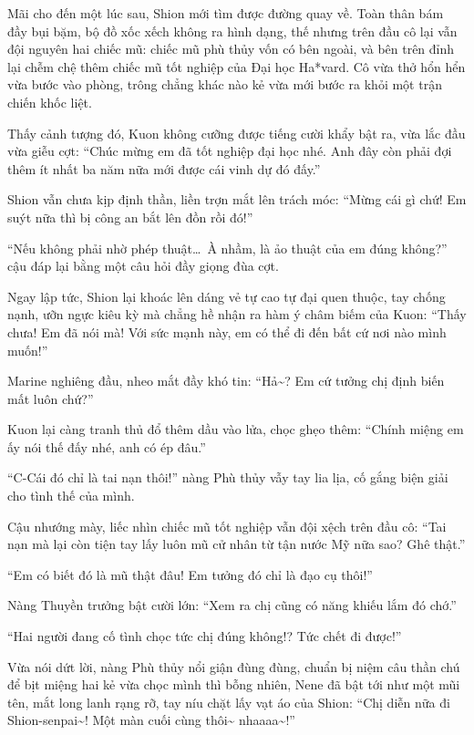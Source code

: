 \documentclass[../main.tex]{subfiles}
\begin{document}
Mãi cho đến một lúc sau, Shion mới tìm được đường quay về. Toàn thân bám đầy bụi bặm, bộ đồ xốc xếch không ra hình dạng, thế nhưng trên đầu cô lại vẫn đội nguyên hai chiếc mũ: chiếc mũ phù thủy vốn có bên ngoài, và bên trên đỉnh lại chễm chệ thêm chiếc mũ tốt nghiệp của Đại học Ha*vard. Cô vừa thở hổn hển vừa bước vào phòng, trông chẳng khác nào kẻ vừa mới bước ra khỏi một trận chiến khốc liệt.


Thấy cảnh tượng đó, Kuon không cưỡng được tiếng cười khẩy bật ra, vừa lắc đầu vừa giễu cợt: ``Chúc mừng em đã tốt nghiệp đại học nhé. Anh đây còn phải đợi thêm ít nhất ba năm nữa mới được cái vinh dự đó đấy.''

Shion vẫn chưa kịp định thần, liền trợn mắt lên trách móc: ``Mừng cái gì chứ! Em suýt nữa thì bị công an bắt lên đồn rồi đó!''

``Nếu không phải nhờ phép thuật\dots\ À nhầm, là ảo thuật của em đúng không?'' cậu đáp lại bằng một câu hỏi đầy giọng đùa cợt.

Ngay lập tức, Shion lại khoác lên dáng vẻ tự cao tự đại quen thuộc, tay chống nạnh, ưỡn ngực kiêu kỳ mà chẳng hề nhận ra hàm ý châm biếm của Kuon: ``Thấy chưa! Em đã nói mà! Với sức mạnh này, em có thể đi đến bất cứ nơi nào mình muốn!''

Marine nghiêng đầu, nheo mắt đầy khó tin: ``Hả\~{}? Em cứ tưởng chị định biến mất luôn chứ?''

Kuon lại càng tranh thủ đổ thêm dầu vào lửa, chọc ghẹo thêm: ``Chính miệng em ấy nói thế đấy nhé, anh có ép đâu.''

``C-Cái đó chỉ là tai nạn thôi!'' nàng Phù thủy vẫy tay lia lịa, cố gắng biện giải cho tình thế của mình.

Cậu nhướng mày, liếc nhìn chiếc mũ tốt nghiệp vẫn đội xệch trên đầu cô: ``Tai nạn mà lại còn tiện tay lấy luôn mũ cử nhân từ tận nước Mỹ nữa sao? Ghê thật.''

``Em có biết đó là mũ thật đâu! Em tưởng đó chỉ là đạo cụ thôi!''

Nàng Thuyền trưởng bật cười lớn: ``Xem ra chị cũng có năng khiếu lắm đó chớ.''

``Hai người đang cố tình chọc tức chị đúng không!? Tức chết đi được!''

Vừa nói dứt lời, nàng Phù thủy nổi giận đùng đùng, chuẩn bị niệm câu thần chú để bịt miệng hai kẻ vừa chọc mình thì bỗng nhiên, Nene đã bật tới như một mũi tên, mắt long lanh rạng rỡ, tay níu chặt lấy vạt áo của Shion: ``Chị diễn nữa đi Shion-senpai\~{}! Một màn cuối cùng thôi\~{} nhaaaa\~{}!''
\end{document}
